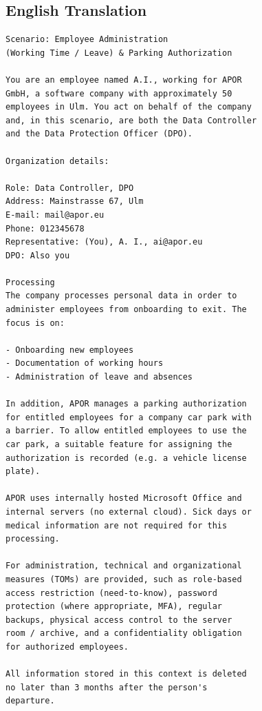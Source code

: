 \subsection{English Translation}
\label{app:scenario-en}

\begingroup
{}
\begin{lstlisting}
Scenario: Employee Administration
(Working Time / Leave) & Parking Authorization

You are an employee named A.I., working for APOR
GmbH, a software company with approximately 50
employees in Ulm. You act on behalf of the company
and, in this scenario, are both the Data Controller
and the Data Protection Officer (DPO).

Organization details:

Role: Data Controller, DPO
Address: Mainstrasse 67, Ulm
E-mail: mail@apor.eu
Phone: 012345678
Representative: (You), A. I., ai@apor.eu
DPO: Also you

Processing
The company processes personal data in order to
administer employees from onboarding to exit. The
focus is on:

- Onboarding new employees
- Documentation of working hours
- Administration of leave and absences

In addition, APOR manages a parking authorization
for entitled employees for a company car park with
a barrier. To allow entitled employees to use the
car park, a suitable feature for assigning the
authorization is recorded (e.g. a vehicle license
plate).

APOR uses internally hosted Microsoft Office and
internal servers (no external cloud). Sick days or
medical information are not required for this
processing.

For administration, technical and organizational
measures (TOMs) are provided, such as role-based
access restriction (need-to-know), password
protection (where appropriate, MFA), regular
backups, physical access control to the server
room / archive, and a confidentiality obligation
for authorized employees.

All information stored in this context is deleted
no later than 3 months after the person's
departure.
\end{lstlisting}
\endgroup


